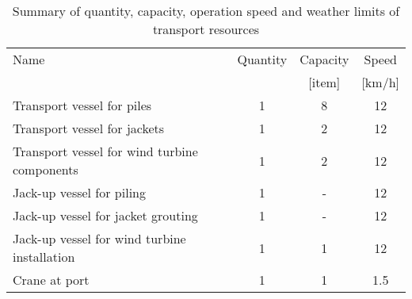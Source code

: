 \begin{table}
\label{tab:input}
\begin{tabular}{lccc}
\hline 
Name & Quantity & Capacity & Speed \\
& & [item] & [km/h]   \\ 
\hline 
Transport vessel for piles & 1 & 8 & 12 \\ 
Transport vessel for jackets & 1 & 2 & 12 \\ 
Transport vessel for wind turbine components & 1 & 2 & 12 \\ 
Jack-up vessel for piling & 1 & - & 12\\
Jack-up vessel for jacket grouting & 1 & - & 12\\
Jack-up vessel for wind turbine installation & 1 & 1 & 12 \\
Crane at port & 1 & 1 & 1.5 \\
\hline 
\end{tabular}

\caption{Summary of quantity, capacity, operation speed and weather limits of transport resources}
\end{table}
